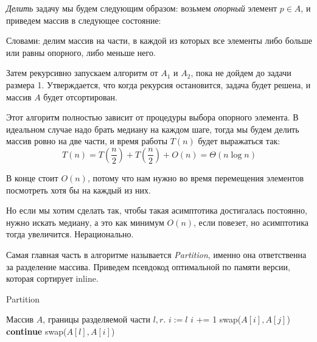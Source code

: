 \documentclass[../book.tex]{subfiles}
\begin{document}
	\textit{Делить} задачу мы будем следующим образом: возьмем \textit{опорный} элемент $p \in A$, и приведем массив в следующее состояние:
	
	\begin{center}
	\end{center}
	
	Словами: делим массив на части, в каждой из которых все элементы либо больше или равны опорного, либо меньше него.
	
	Затем рекурсивно запускаем алгоритм от $A_1$ и $A_2$, пока не дойдем до задачи размера 1. Утверждается, что когда рекурсия остановится, задача будет решена, и массив $A$ будет отсортирован.
	
	Этот алгоритм полностью зависит от процедуры выбора опорного элемента. В идеальном случае надо брать медиану на каждом шаге, тогда мы будем делить массив ровно на две части, и время работы $T(n)$ будет выражаться так:
	\[
	T(n) = T\left(\frac{n}{2}\right) + T\left(\frac{n}{2}\right) + O(n) = \Theta(n\log n)
	\]
	
	В конце стоит $O(n)$, потому что нам нужно во время перемещения элементов посмотреть хотя бы на каждый из них. 
	
	Но если мы хотим сделать так, чтобы такая асимптотика достигалась постоянно, нужно искать медиану, а это как минимум $O(n)$, если повезет, но асимптотика тогда увеличится. Нерационально. 
	
	Самая главная часть в алгоритме называется \textit{Partition}, именно она ответственна за разделение массива. Приведем псевдокод оптимальной по памяти версии, которая сортирует inline. 
	
	\begin{algorithm}[H]
		\caption{Partition}
		\begin{algorithmic}[1]
			\Require Массив $A$, границы разделяемой части $l, r$.
				\State $i := l$
						\State $i$ += 1
						\State swap($A[i], A[j]$)
					\Else
						\State \textbf{continue}
					\EndIf
				\EndFor
				\State swap($A[l], A[i]$)
			\EndFunction
		\end{algorithmic}
	\end{algorithm}
	
\end{document}
